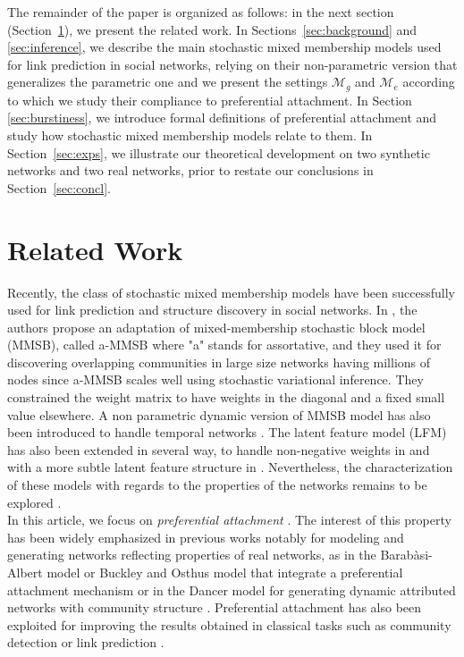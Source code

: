 The remainder of the paper is organized as follows: in the next section (Section~\ref{sec:rel-work}), we present the related work. In Sections~\ref{sec:background} and \ref{sec:inference}, we describe the main stochastic mixed membership models used for link prediction in social networks, relying on their non-parametric version that generalizes the parametric one and we present the settings $\mathcal{M}_g$ and $\mathcal{M}_e$ according to which we study their compliance to preferential attachment. In Section \ref{sec:burstiness}, we introduce formal definitions of preferential attachment and study how stochastic mixed membership models relate to them. In Section~\ref{sec:exps}, we illustrate our theoretical development on two synthetic networks and two real networks, prior to restate our conclusions in Section~\ref{sec:concl}. 

\section{Related Work}
\label{sec:rel-work}

Recently,  the class of stochastic mixed membership models have been successfully used for link prediction and structure discovery in social networks.  In \cite{AMMSB}, the authors  propose an adaptation of mixed-membership stochastic block model (MMSB), called a-MMSB where "a" stands for assortative, and they used it for discovering overlapping communities in large size networks having millions of nodes since a-MMSB  scales well using stochastic variational inference. They constrained the weight matrix to have weights in the diagonal and a fixed small value elsewhere. A non parametric dynamic version of MMSB model has also been introduced to  handle temporal networks \cite{fan2015dynamic}. The latent feature model (LFM) has also been extended in several way, to handle non-negative weights in \cite{IMRM} and with a more subtle latent feature structure in \cite{ILAM}. Nevertheless, the characterization of these models with regards to the properties of the networks remains to be explored \cite{jacobs2014unified}. ~\\

In this article, we focus on \textit{preferential attachment} \cite{Newman2010, Barabasi2003}. The interest of this property has been widely emphasized in previous works notably for modeling and generating networks reflecting properties of real networks, as in the Barab\`asi-Albert model \cite{albert2002statistical} or Buckley and Osthus model \cite{Buckley2001} that integrate a preferential attachment mechanism or in the Dancer model for generating dynamic attributed networks with community structure \cite{Largeron2017}. Preferential attachment has also  been exploited for improving the results obtained in classical tasks such as community detection \cite{Ciglan2013} or link prediction \cite{Zeng2016}. \\

